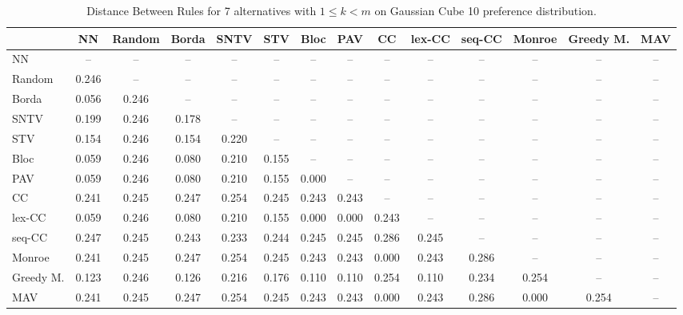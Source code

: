 
\begin{table*}
\centering
\begin{tabular}{lccccccccccccc}
\toprule
 & NN & Random & Borda & SNTV & STV & Bloc & PAV & CC & lex-CC & seq-CC & Monroe & Greedy M. & MAV \\
\midrule
NN & -- & -- & -- & -- & -- & -- & -- & -- & -- & -- & -- & -- & -- \\
Random & 0.246 & -- & -- & -- & -- & -- & -- & -- & -- & -- & -- & -- & -- \\
Borda & 0.056 & 0.246 & -- & -- & -- & -- & -- & -- & -- & -- & -- & -- & -- \\
SNTV & 0.199 & 0.246 & 0.178 & -- & -- & -- & -- & -- & -- & -- & -- & -- & -- \\
STV & 0.154 & 0.246 & 0.154 & 0.220 & -- & -- & -- & -- & -- & -- & -- & -- & -- \\
Bloc & 0.059 & 0.246 & 0.080 & 0.210 & 0.155 & -- & -- & -- & -- & -- & -- & -- & -- \\
PAV & 0.059 & 0.246 & 0.080 & 0.210 & 0.155 & 0.000 & -- & -- & -- & -- & -- & -- & -- \\
CC & 0.241 & 0.245 & 0.247 & 0.254 & 0.245 & 0.243 & 0.243 & -- & -- & -- & -- & -- & -- \\
lex-CC & 0.059 & 0.246 & 0.080 & 0.210 & 0.155 & 0.000 & 0.000 & 0.243 & -- & -- & -- & -- & -- \\
seq-CC & 0.247 & 0.245 & 0.243 & 0.233 & 0.244 & 0.245 & 0.245 & 0.286 & 0.245 & -- & -- & -- & -- \\
Monroe & 0.241 & 0.245 & 0.247 & 0.254 & 0.245 & 0.243 & 0.243 & 0.000 & 0.243 & 0.286 & -- & -- & -- \\
Greedy M. & 0.123 & 0.246 & 0.126 & 0.216 & 0.176 & 0.110 & 0.110 & 0.254 & 0.110 & 0.234 & 0.254 & -- & -- \\
MAV & 0.241 & 0.245 & 0.247 & 0.254 & 0.245 & 0.243 & 0.243 & 0.000 & 0.243 & 0.286 & 0.000 & 0.254 & -- \\
\bottomrule
\end{tabular}

\caption{Distance Between Rules for 7 alternatives with $1 \leq k < m$ on Gaussian Cube 10 preference distribution.}
\end{table*}
